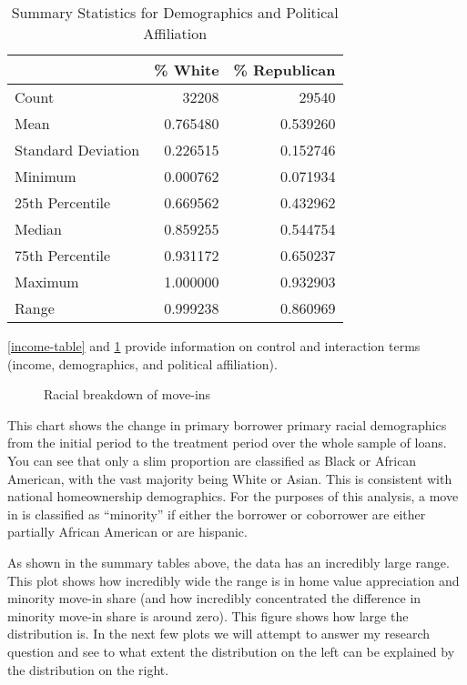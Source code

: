 \documentclass{article}
\begin{document}
\begin{table}[H]
    \centering
    \caption{Summary Statistics for Demographics and Political Affiliation}
    \label{demo-table}
    \begin{tabular}{l|rr}\toprule
     & \% White & \% Republican \\\midrule
    Count & 32208 & 29540 \\
    Mean & 0.765480 & 0.539260 \\
    Standard Deviation & 0.226515 & 0.152746 \\
    Minimum & 0.000762 & 0.071934 \\
    25th Percentile & 0.669562 & 0.432962 \\
    Median & 0.859255 & 0.544754 \\
    75th Percentile & 0.931172 & 0.650237 \\
    Maximum & 1.000000 & 0.932903 \\
    Range & 0.999238 & 0.860969 \\\bottomrule
    \end{tabular}
\end{table}
\cref{income-table} and \cref{demo-table} provide information on control and interaction terms (income, demographics, and political affiliation).
\setcounter{figure}{-1}
\begin{figure}[H]
    \caption{Racial breakdown of move-ins}
\end{figure} 
This chart shows the change in primary borrower primary racial demographics from the initial period to the treatment period over the whole sample of loans. You can see that only a slim proportion are classified as Black or African American, with the vast majority being White or Asian. This is consistent with national homeownership demographics. For the purposes of this analysis, a move in is classified as ``minority'' if either the borrower or coborrower are either partially African American or are hispanic.
\begin{center}
    \end{center}    
    As shown in the summary tables above, the data has an incredibly large range. This plot shows how incredibly wide the range is in home value appreciation and minority move-in share (and how incredibly concentrated the difference in minority move-in share is around zero). This figure shows how large the distribution is. In the next few plots we will attempt to answer my research question and see to what extent the distribution on the left can be explained by the distribution on the right.
\end{document}
